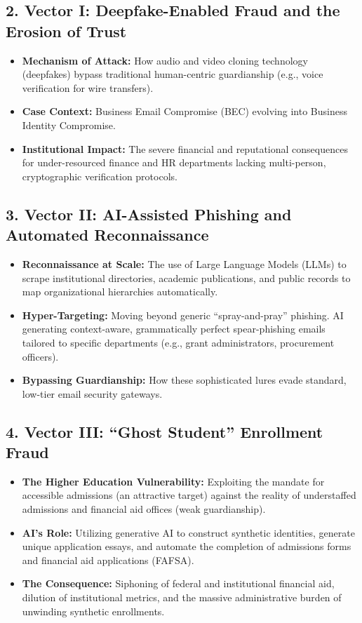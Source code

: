 \documentclass[11pt, a4paper]{article}
\begin{document}
\subsection{2. Vector I: Deepfake-Enabled Fraud and the Erosion of Trust}
\begin{itemize}
    \item \textbf{Mechanism of Attack:} How audio and video cloning technology (deepfakes) bypass traditional human-centric guardianship (e.g., voice verification for wire transfers).
    \item \textbf{Case Context:} Business Email Compromise (BEC) evolving into Business Identity Compromise.
    \item \textbf{Institutional Impact:} The severe financial and reputational consequences for under-resourced finance and HR departments lacking multi-person, cryptographic verification protocols.
\end{itemize}

\subsection{3. Vector II: AI-Assisted Phishing and Automated Reconnaissance}
\begin{itemize}
    \item \textbf{Reconnaissance at Scale:} The use of Large Language Models (LLMs) to scrape institutional directories, academic publications, and public records to map organizational hierarchies automatically.
    \item \textbf{Hyper-Targeting:} Moving beyond generic ``spray-and-pray'' phishing. AI generating context-aware, grammatically perfect spear-phishing emails tailored to specific departments (e.g., grant administrators, procurement officers).
    \item \textbf{Bypassing Guardianship:} How these sophisticated lures evade standard, low-tier email security gateways.
\end{itemize}

\subsection{4. Vector III: ``Ghost Student'' Enrollment Fraud}
\begin{itemize}
    \item \textbf{The Higher Education Vulnerability:} Exploiting the mandate for accessible admissions (an attractive target) against the reality of understaffed admissions and financial aid offices (weak guardianship).
    \item \textbf{AI's Role:} Utilizing generative AI to construct synthetic identities, generate unique application essays, and automate the completion of admissions forms and financial aid applications (FAFSA).
    \item \textbf{The Consequence:} Siphoning of federal and institutional financial aid, dilution of institutional metrics, and the massive administrative burden of unwinding synthetic enrollments.
\end{itemize}
\end{document}
